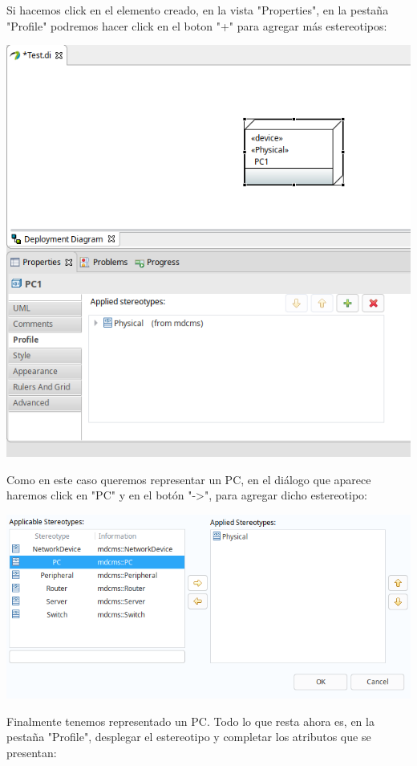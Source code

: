 \documentclass[11pt]{article}
\begin{document}
Si hacemos click en el elemento creado, en la vista "Properties", en
la pestaña "Profile" podremos hacer click en el boton "+" para agregar
más estereotipos:

\begin{center}
\includegraphics[width=.9\linewidth]{images/modelo_3.png}
\end{center}

Como en este caso queremos representar un PC, en el diálogo que
aparece haremos click en "PC" y en el botón "->", para agregar dicho
estereotipo:

\begin{center}
\includegraphics[width=.9\linewidth]{images/modelo_5.png}
\end{center}

Finalmente tenemos representado un PC. Todo lo que resta ahora es, en
la pestaña "Profile", desplegar el estereotipo y completar los
atributos que se presentan:
\end{document}
